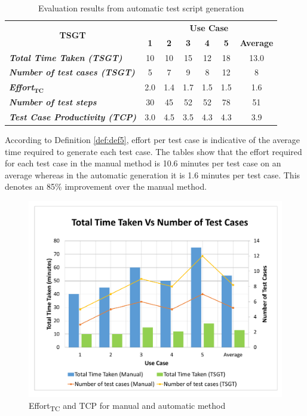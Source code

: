 \begin{table}[htbp]
  \centering
  \caption{Evaluation results from automatic test script generation}
  	\begin{adjustbox}{width=1\textwidth}
    \begin{tabular}{|l|c|c|c|c|c|c|}
    \toprule
    \multicolumn{1}{|c|}{\multirow{2}[4]{*}{\textbf{TSGT}}} & \multicolumn{6}{c|}{\textbf{Use Case }} \\
\cmidrule{2-7}          & \textbf{1} & \textbf{2} & \textbf{3} & \textbf{4} & \textbf{5} & \textbf{Average} \\
    \midrule
    \textit{\textbf{Total Time Taken (TSGT)}} & 10    & 10    & 15    & 12    & 18    & 13.0 \\
    \midrule
    \textit{\textbf{Number of test cases (TSGT)}} & 5     & 7     & 9     & 8     & 12    & 8 \\
    \midrule
    \textit{\textbf{Effort$ _{\textbf{TC}}$}} & 2.0   & 1.4   & 1.7   & 1.5   & 1.5   & 1.6 \\
    \midrule
    \textit{\textbf{Number of test steps}} & 30    & 45    & 52    & 52    & 78    & 51 \\
    \midrule
    \textit{\textbf{Test Case Productivity (TCP)}} & 3.0   & 4.5   & 3.5   & 4.3   & 4.3   & 3.9 \\
    \bottomrule
    \end{tabular}%
    \end{adjustbox}
  \label{tab:toolresults}%
\end{table}%


According to Definition \ref{def:def5}, effort per test case is indicative of the average time required to generate each test case. The tables show that the effort required for each test case in the manual method is 10.6 minutes per test case on an average whereas in the automatic generation it is 1.6 minutes per test case. This denotes an 85\% improvement over the manual method.

\begin{figure}[htb!]
\centering
\includegraphics[scale=0.45]{content/images/Chapter6/figure2.pdf}
\caption{Effort\textsubscript{TC} and TCP for manual and automatic method}
\label{fig:chap6fig2}
\end{figure}

